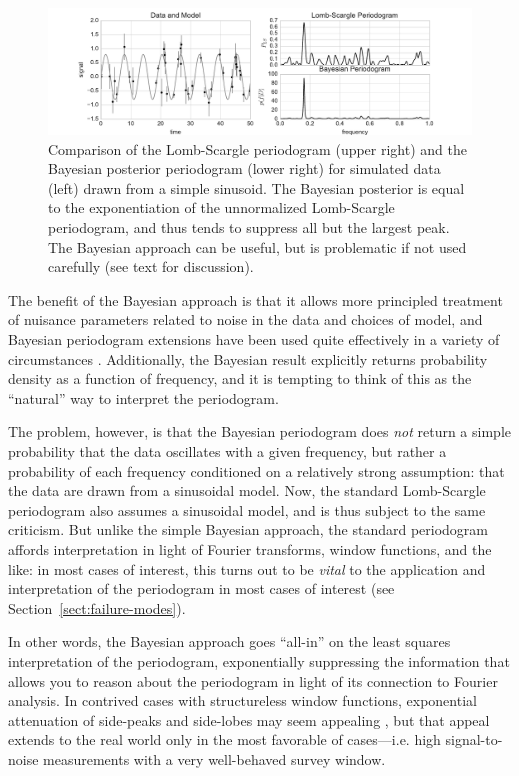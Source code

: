 \documentclass[preprint]{aastex}
\newcommand{\figlabel}[1]{\label{fig:#1}}
\newcommand{\Sect}[1]{Section~\ref{sect:#1}}
\newcommand{\sect}[1]{\Sect{#1}}
\begin{document}
\begin{figure}[ht]
  \centering
  \includegraphics[width=\textwidth]{fig24_bayesian_periodogram}
  \caption{Comparison of the Lomb-Scargle periodogram (upper right) and the
    Bayesian posterior periodogram (lower right) for simulated data (left)
    drawn from a simple sinusoid.
    The Bayesian posterior is equal to the exponentiation of the unnormalized
    Lomb-Scargle periodogram, and thus tends to suppress all but the largest
    peak. The Bayesian approach can be useful, but is problematic if
    not used carefully (see text for discussion).
    \figlabel{bayesian-periodogram}}
\end{figure}

The benefit of the Bayesian approach is that it allows more principled treatment
of nuisance parameters related to noise in the data and choices of model,
and Bayesian periodogram extensions have been used quite effectively in a
variety of circumstances \citep[see, e.g.][]{Bretthorst88}.
Additionally, the Bayesian result explicitly returns probability density as
a function of frequency, and it is tempting to think of this as the
``natural'' way to interpret the periodogram.

The problem, however, is that the Bayesian periodogram does {\it not} return
a simple probability that the data oscillates with a given frequency, but rather
a probability of each frequency conditioned on a relatively strong assumption:
that the data are drawn from a sinusoidal model.
Now, the standard Lomb-Scargle periodogram also assumes a sinusoidal model,
and is thus subject to the same criticism.
But unlike the simple Bayesian approach, the standard periodogram affords
interpretation in light of Fourier transforms, window functions, and the
like: in most cases of interest, this turns out to be {\it vital} to the
application and interpretation of the periodogram in most cases of interest
(see \sect{failure-modes}).

In other words, the Bayesian approach goes ``all-in'' on the least squares
interpretation of the periodogram, exponentially suppressing the information
that allows you to reason about the periodogram in light of its connection
to Fourier analysis.
In contrived cases with structureless window functions, exponential attenuation
of side-peaks and side-lobes may seem appealing \citep[see, e.g.][]{Mortier15},
but that appeal extends to the real world only in the most favorable of
cases---{i.e.} high signal-to-noise measurements with a very well-behaved
survey window.
\end{document}
